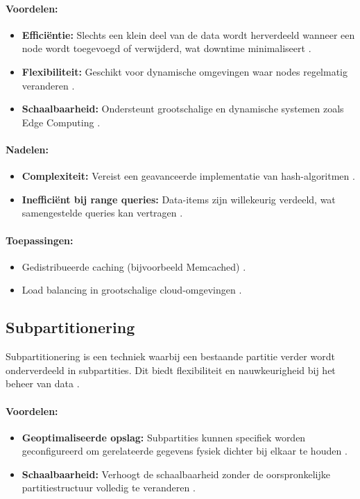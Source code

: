 \paragraph{Voordelen:}
\begin{itemize}
    \item \textbf{Efficiëntie:} Slechts een klein deel van de data wordt herverdeeld wanneer een node wordt toegevoegd of verwijderd, wat downtime minimaliseert \autocite{Kleppmann2017}.
    \item \textbf{Flexibiliteit:} Geschikt voor dynamische omgevingen waar nodes regelmatig veranderen \autocite{Kleppmann2017}.
    \item \textbf{Schaalbaarheid:} Ondersteunt grootschalige en dynamische systemen zoals Edge Computing \autocite{Kleppmann2017}.
\end{itemize}

\paragraph{Nadelen:}
\begin{itemize}
    \item \textbf{Complexiteit:} Vereist een geavanceerde implementatie van hash-algoritmen \autocite{Kleppmann2017}.
    \item \textbf{Inefficiënt bij range queries:} Data-items zijn willekeurig verdeeld, wat samengestelde queries kan vertragen \autocite{Mahmud2020}.
\end{itemize}

\paragraph{Toepassingen:}
\begin{itemize}
    \item Gedistribueerde caching (bijvoorbeeld Memcached) \autocite{Kleppmann2017}.
    \item Load balancing in grootschalige cloud-omgevingen \autocite{Kleppmann2017}.
\end{itemize}

\subsection{Subpartitionering}
Subpartitionering is een techniek waarbij een bestaande partitie verder wordt onderverdeeld in subpartities. Dit biedt flexibiliteit en nauwkeurigheid bij het beheer van data \autocite{Mahmud2020}.

\paragraph{Voordelen:}
\begin{itemize}
    \item \textbf{Geoptimaliseerde opslag:} Subpartities kunnen specifiek worden geconfigureerd om gerelateerde gegevens fysiek dichter bij elkaar te houden \autocite{Mahmud2020}.
    \item \textbf{Schaalbaarheid:} Verhoogt de schaalbaarheid zonder de oorspronkelijke partitiestructuur volledig te veranderen \autocite{Mahmud2020}.
\end{itemize}

